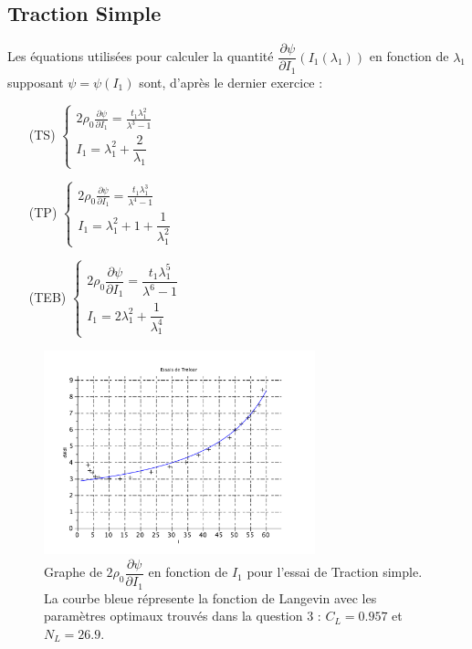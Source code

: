 \documentclass[a4paper,11pt]{article}
\begin{document}
\subsection {Traction Simple}
Les équations utilisées pour calculer la quantité $\dfrac{\partial\psi}{\partial I_1} (I_1(\lambda_1))$ en fonction de $\lambda_1$ supposant $\psi = \psi(I_1)$ sont, d'après le dernier exercice :
\begin{enumerate}
\item[(TS)]
$
\begin{cases}
2 \rho_0 \frac{\partial\psi}{\partial I_1} = \frac{t_1\lambda_1^2}{\lambda^3-1}\\
I_1 = \lambda_1^2 + \dfrac{2}{\lambda_1}
\end{cases}
$
\item[(TP)]
$
\begin{cases}
2 \rho_0 \frac{\partial\psi}{\partial I_1} = \frac{t_1\lambda_1^3}{\lambda^4-1}\\
I_1 = \lambda_1^2 + 1 + \dfrac{1}{\lambda_1^2}
\end{cases}
$
\item[(TEB)]
$
\begin{cases}
2 \rho_0 \dfrac{\partial\psi}{\partial I_1} = \dfrac{t_1\lambda_1^5}{\lambda^6-1}\\
I_1 = 2\lambda_1^2 + \dfrac{1}{\lambda_1^4}
\end{cases}
$
\end{enumerate}

\begin{figure}[!ht]
\centering
\includegraphics[width=0.7\textwidth]{scilab_prof/q31.pdf}
\caption{Graphe de $2 \rho_0 \dfrac{\partial\psi}{\partial I_1}$ en fonction de $I_1$ pour l'essai de Traction simple. La courbe bleue répresente la fonction de Langevin avec les paramètres optimaux trouvés dans la question 3 : $C_L = 0.957$ et $N_L=26.9$.}
\label{fig:31}
\end{figure}
\end{document}
